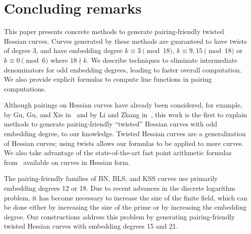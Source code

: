 \section{Concluding remarks}
\label{sec:conclude}


This paper presents concrete methods to generate pairing-friendly twisted Hessian curves.
Curves generated by these methods are guaranteed to have twists of degree $3$, and
have embedding degree
$k \equiv 3 \pmod{18}$,
$k \equiv 9,15 \pmod{18}$ or
$k \equiv 0 \pmod{6}$ where $18 \nmid k$.
We describe techniques to eliminate intermediate denominators for odd embedding degrees, leading to faster overall computation.
We also provide explicit formulas to compute line functions in pairing computations.

Although pairings on Hessian curves have already been considered,
for example, by Gu, Gu, and Xie in~\cite{2010/Gu} and by Li and Zhang in~\cite{2012/Li},
this work is the first to explain methods to generate pairing-friendly ``twisted'' Hessian curves with odd embedding degree, to our knowledge. Twisted Hessian curves are a generalization of Hessian curves; using twists allows our formulas to be applied to more curves. We also take advantage of the state-of-the-art fast point arithmetic formulas from~\cite{2015/hessian} available on curves in Hessian form.

The pairing-friendly families of BN, BLS, and KSS curves use primarily embedding degrees 12 or 18. Due to recent advances in the discrete logarithm problem, it has become necessary to increase the size of the finite field, which can be done either by increasing the size of the prime or by increasing the embedding degree. Our constructions address this problem by generating pairing-friendly twisted Hessian curves with embedding degrees 15 and 21.

